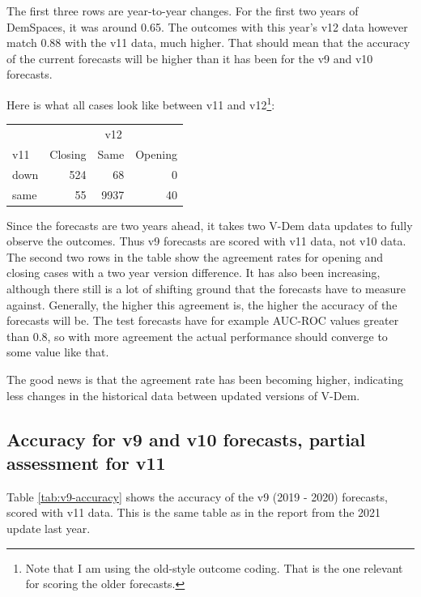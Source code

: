 \documentclass[
  11pt,
]{article}
\begin{document}
The first three rows are year-to-year changes. For the first two years
of DemSpaces, it was around 0.65. The outcomes with this year's v12 data
however match 0.88 with the v11 data, much higher. That should mean that
the accuracy of the current forecasts will be higher than it has been
for the v9 and v10 forecasts.

Here is what all cases look like between v11 and v12\footnote{Note that
  I am using the old-style outcome coding. That is the one relevant for
  scoring the older forecasts.}:

\begin{tabular}{lrrr}
\toprule
\multicolumn{1}{c}{} & \multicolumn{3}{c}{v12} \\
\cmidrule(l{3pt}r{3pt}){2-4}
v11 & Closing & Same & Opening\\
\midrule
down & 524 & 68 & 0\\
same & 55 & 9937 & 40\\
\bottomrule
\end{tabular}

Since the forecasts are two years ahead, it takes two V-Dem data updates
to fully observe the outcomes. Thus v9 forecasts are scored with v11
data, not v10 data. The second two rows in the table show the agreement
rates for opening and closing cases with a two year version difference.
It has also been increasing, although there still is a lot of shifting
ground that the forecasts have to measure against. Generally, the higher
this agreement is, the higher the accuracy of the forecasts will be. The
test forecasts have for example AUC-ROC values greater than 0.8, so with
more agreement the actual performance should converge to some value like
that.

The good news is that the agreement rate has been becoming higher,
indicating less changes in the historical data between updated versions
of V-Dem.

\hypertarget{accuracy-for-v9-and-v10-forecasts-partial-assessment-for-v11}{%
\subsection{Accuracy for v9 and v10 forecasts, partial assessment for
v11}\label{accuracy-for-v9-and-v10-forecasts-partial-assessment-for-v11}}

Table \ref{tab:v9-accuracy} shows the accuracy of the v9 (2019 - 2020)
forecasts, scored with v11 data. This is the same table as in the report
from the 2021 update last year.
\end{document}
